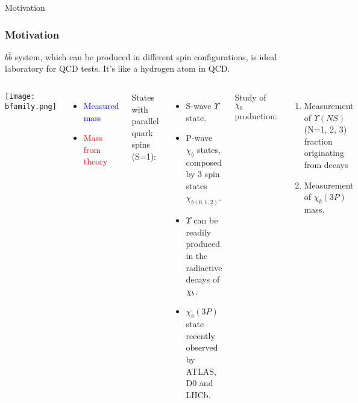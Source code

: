 \begin{frame}{Motivation}

\frametitle{Motivation}
$b\bar{b}$ system, which can be produced in different spin configurations, is
ideal laboratory for QCD tests. It's like a hydrogen atom in QCD.
\begin{columns}[c]
\texttt{[image: bfamily.png]}
\begin{itemize}
  \item \textcolor{blue}{Measured mass}
  \item \textcolor{red}{Mass from theory}
\end{itemize}
\fontsize{9pt}{7.2}\selectfont
States with parallel quark spins (S=1):
\begin{itemize}
  \item S-wave $\Upsilon$ state.
  \item P-wave $\chi_{b}$ states, composed by 3 spin states $\chi_{b(0,1,2)}$. 
  \item $\Upsilon$ can be readily produced in the radiactive decays of $\chi_{b}$.
  \item $\chi_{b}(3P)$ state recently observed by ATLAS, D0 and LHCb.
\end{itemize}
Study of $\chi_{b}$ production:
\begin{enumerate}
  \item Measurement of  $\Upsilon(NS)$ (N=1, 2, 3) fraction  originating from \chib decays
  \item Measurement of $\chi_{b}(3P)$ mass.
\end{enumerate}
\end{columns}

\end{frame}